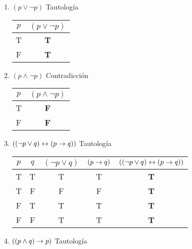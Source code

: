 \begin{enumerate}[label=\alph*)]
      \item $(p \lor \neg p)$ Tautología

            \begin{tabular}{|c|c|}
                  \hline
                  $p$ & $(p \lor \neg p)$ \\
                  \hline
                  T   & \textbf{T}        \\
                  F   & \textbf{T}        \\
                  \hline
            \end{tabular}

      \item $(p \land \neg p)$ Contradicción

            \begin{tabular}{|c|c|}
                  \hline
                  $p$ & $(p \land \neg p)$ \\
                  \hline
                  T   & \textbf{F}         \\
                  F   & \textbf{F}         \\
                  \hline
            \end{tabular}

      \item $((\neg p \lor q) \leftrightarrow (p \rightarrow q))$ Tautología

            \begin{tabular}{|c|c|c|c|c|}
                  \hline
                  $p$ & $q$ & $(\neg p \lor q)$ & $(p \rightarrow q)$ & $((\neg p \lor q) \leftrightarrow (p \rightarrow q))$ \\
                  \hline
                  T   & T   & T                 & T             & \textbf{T}                           \\
                  T   & F   & F                 & F             & \textbf{T}                           \\
                  F   & T   & T                 & T             & \textbf{T}                           \\
                  F   & F   & T                 & T             & \textbf{T}                           \\
                  \hline
            \end{tabular}

      \item $((p \land q) \rightarrow p)$ Tautología


\end{enumerate}
